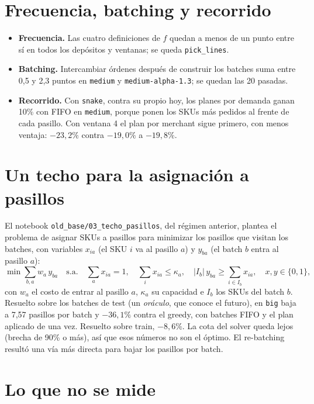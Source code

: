 \documentclass[11pt,a4paper,oneside]{report}
\newcommand{\code}[1]{\texttt{\small #1}}
\begin{document}
\section{Frecuencia, batching y recorrido}

\begin{itemize}
  \item \textbf{Frecuencia.} Las cuatro definiciones de $f$ quedan a menos de un punto entre sí
        en todos los depósitos y ventanas; se queda \code{pick\_lines}.
  \item \textbf{Batching.} Intercambiar órdenes después de construir los batches suma entre 0,5
        y 2,3 puntos en \code{medium} y \code{medium-alpha-1.3}; se quedan las 20 pasadas.
  \item \textbf{Recorrido.} Con \code{snake}, contra su propio hoy, los planes por demanda ganan
        10\% con FIFO en \code{medium}, porque ponen los SKUs más pedidos al frente de cada
        pasillo. Con ventana 4 el plan por merchant sigue primero, con menos ventaja: $-23{,}2\%$
        contra $-19{,}0\%$ a $-19{,}8\%$.
\end{itemize}

\section{Un techo para la asignación a pasillos}

El notebook \code{old\_base/03\_techo\_pasillos}, del régimen anterior, plantea el problema de
asignar SKUs a pasillos para minimizar los pasillos que visitan los batches, con variables
$x_{ia}$ (el SKU $i$ va al pasillo $a$) y $y_{ba}$ (el batch $b$ entra al pasillo $a$):
\[
\min \sum_{b, a} w_a\, y_{ba} \quad \text{s.a.} \quad \sum_a x_{ia} = 1,\quad
\sum_i x_{ia} \le \kappa_a,\quad |I_b|\, y_{ba} \ge \sum_{i \in I_b} x_{ia},\quad
x, y \in \{0,1\},
\]
con $w_a$ el costo de entrar al pasillo $a$, $\kappa_a$ su capacidad e $I_b$ los SKUs del
batch $b$. Resuelto sobre los batches de test (un \emph{oráculo}, que conoce el futuro), en
\code{big} baja a 7,57 pasillos por batch y $-36{,}1\%$ contra el greedy, con batches FIFO y el
plan aplicado de una vez. Resuelto sobre train, $-8{,}6\%$. La cota del solver queda lejos
(brecha de 90\% o más), así que esos números no son el óptimo. El re-batching resultó una vía
más directa para bajar los pasillos por batch.

\section{Lo que no se mide}
\end{document}

